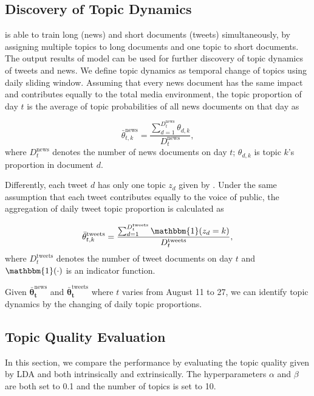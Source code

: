 \subsection{Discovery of Topic Dynamics}

\stlda is able to train long (news) and short documents (tweets) simultaneously, by assigning multiple topics to long documents and one topic to short documents. The output results of \stlda model can be used for further discovery of topic dynamics of tweets and news. We define topic dynamics as temporal change of topics using daily sliding window. Assuming that every news document has the same impact and contributes equally to the total media environment, the topic proportion of day $t$ is the average of topic probabilities of all news documents on that day as

\begin{equation}
\bar{\theta}_{t,k}^{\mathrm{news}}=\frac{\sum_{d=1}^{D_t^{\mathrm{news}}} \theta_{d,k}}{D_t^{\mathrm{news}}},
\end{equation}
where $D_t^{\mathrm{news}}$ denotes the number of news documents on day $t$; $\theta_{d,k}$ is topic $k$'s proportion in document $d$.

Differently, each tweet $d$ has only one topic $z_d$ given by \stlda. Under the same assumption that each tweet contributes equally to the voice of public, the aggregation of daily tweet topic proportion is calculated as

\begin{equation}
\bar{\theta}_{t,k}^{\mathrm{tweets}} = \frac{\sum_{d=1}^{D_t^{\mathrm{tweets}}} \mathbbm{1}(z_d=k)}{D_t^{\mathrm{tweets}}},
\end{equation}
where $D_t^{\mathrm{tweets}}$ denotes the number of tweet documents on day $t$ and $\mathbbm{1}(\cdot)$ is an indicator function.

Given $\bm{\bar{\theta}_t^{\mathrm{news}}}$ and $\bm{\bar{\theta}_t^{\mathrm{tweets}}}$ where $t$ varies from August 11 to 27, we can identify topic dynamics by the changing of daily topic proportions.


\subsection{Topic Quality Evaluation}

In this section, we compare the performance by evaluating the topic quality given by LDA and \stlda both intrinsically and extrinsically. The hyperparameters $\alpha$ and $\beta$ are both set to 0.1 and the number of topics is set to 10.

